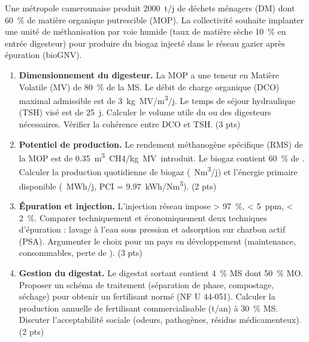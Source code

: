 \documentclass[11pt]{article}
\begin{document}
\begin{exercice}
Une métropole camerounaise produit \SI{2000}{t/j} de déchets ménagers (DM) dont \SI{60}{\%} de matière organique putrescible (MOP). La collectivité souhaite implanter une unité de méthanisation par voie humide (taux de matière sèche \SI{10}{\%} en entrée digesteur) pour produire du biogaz injecté dans le réseau gazier après épuration (bioGNV).

\begin{enumerate}
\item \textbf{Dimensionnement du digesteur.} La MOP a une teneur en Matière Volatile (MV) de \SI{80}{\%} de la MS. Le débit de charge organique (DCO) maximal admissible est de \SI{3}{kg MV/m^3/j}. Le temps de séjour hydraulique (TSH) visé est de \SI{25}{j}. Calculer le volume utile du ou des digesteurs nécessaires. Vérifier la cohérence entre DCO et TSH. (3 pts)
\item \textbf{Potentiel de production.} Le rendement méthanogène spécifique (RMS) de la MOP est de \SI{0,35}{m^3 CH4/kg MV introduit}. Le biogaz contient \SI{60}{\%} de . Calculer la production quotidienne de biogaz (\SI{}{Nm^3/j}) et l'énergie primaire disponible (\SI{}{MWh/j}, PCI  = \SI{9,97}{kWh/Nm^3}). (2 pts)
\item \textbf{Épuration et injection.} L'injection réseau impose  > \SI{97}{\%},  < \SI{5}{ppm},  < \SI{2}{\%}. Comparer techniquement et économiquement deux techniques d'épuration : lavage à l'eau sous pression et adsorption sur charbon actif (PSA). Argumenter le choix pour un pays en développement (maintenance, consommables, perte de ). (3 pts)
\item \textbf{Gestion du digestat.} Le digestat sortant contient \SI{4}{\%} MS dont \SI{50}{\%} MO. Proposer un schéma de traitement (séparation de phase, compostage, séchage) pour obtenir un fertilisant normé (NF U 44-051). Calculer la production annuelle de fertilisant commercialisable (t/an) à \SI{30}{\%} MS. Discuter l'acceptabilité sociale (odeurs, pathogènes, résidus médicamenteux). (2 pts)
\end{enumerate}
\end{exercice}
\end{document}
